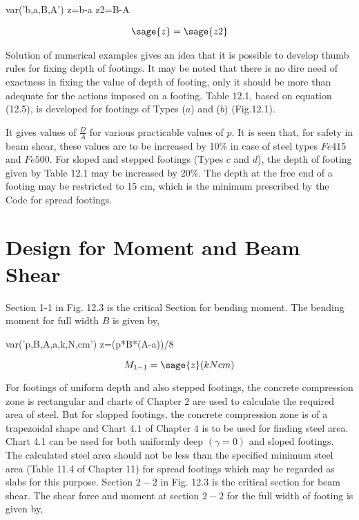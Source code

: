 \begin{sagesilent}                                                      
        var('b,a,B,A')                                                
        z=b-a
        z2=B-A                                                    
\end{sagesilent}  

\begin{align}
       \sage{z}=\sage{z2} 
\end{align} 

Solution of numerical examples gives an idea that it is possible to develop
thumb rules for fixing depth of footings. It may be noted that there is no
dire need of exactness in fixing the value of depth of footing, only it
should be more than adequate for the actions imposed on a footing. Table
12.1, based on equation (12.5), is developed for footings of Types ($a$) and
($b$) (Fig.12.1).

It gives values of $\frac{D}{A}$ for various practicable values of $p$. It
is seen that, for safety in beam shear, these values are to be increased by
10\% in case of steel types $Fe 415$ and $Fe 500$. For sloped and
stepped footings (Types $c$ and $d$), the depth of footing given by Table 12.1
may be increased by 20\%. The depth at the free end of a footing may be
restricted to 15 cm, which is the minimum prescribed by the Code for spread
footings.
 



 \section{Design for Moment and Beam Shear} 
 Section 1-1 in Fig. 12.3 is the critical  Section for bending moment. The bending moment
for full width $B$ is given by,

\begin{sagesilent}                                                      
        var('p,B,A,a,k,N,cm')                                                
        z=(p*B*(A-a))/8                                           
\end{sagesilent}  

\begin{equation}
        \label{eq:(1.10)}
        M_{1-1}=\sage{z}(kNcm)
\end{equation}

For footings of uniform depth and also stepped footings, the concrete compression zone is
rectangular and charts of Chapter 2 are used to calculate the required area of steel. But for slopped footings, the concrete compression zone is of a trapezoidal shape and Chart $4.1$ of Chapter $4$ is to be used for finding steel area. 
Chart 4.1 can be used for both uniformly deep $(\gamma = 0)$ and sloped footings.
The calculated steel area should not be less than the 
speciﬁed minimum steel area (Table 11.4 of Chapter 11)
for spread footings which may be regarded as slabs for this purpose. 
Section $2-2$ in Fig. 12.3 is the critical section for beam shear.
The shear force and moment at section $2-2$ for the full width of footing is given by,

